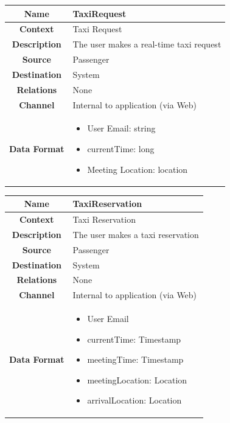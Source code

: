 \documentclass[11pt, a4paper,titlepage]{article}
\begin{document}
		\begin{tabularx}{\textwidth}{| c | X |}
			\hline
			\textbf{Name} & 
			TaxiRequest
			\\
			\hline
			\textbf{Context} & 
				Taxi Request
			\\
			\hline
			\textbf{Description} & 
			The user makes a real-time taxi request
			\\
			\hline
			\textbf{Source} &
				Passenger
			\\
			\hline
			\textbf{Destination} & 
				System
			\\
			\hline
			\textbf{Relations} & 
				None
			\\
			\hline
			\textbf{Channel} & 
				Internal to application (via Web)
			\\
			\hline
			\textbf{Data Format} & 
			 \begin{itemize}
				 \item User Email: string
				 \item currentTime: long
				 \item Meeting Location: location
			 \end{itemize}
			\\
			\hline		
		\end{tabularx}
		\begin{tabularx}{\textwidth}{| c | X |}
			\hline
			\textbf{Name} & 
			TaxiReservation
			\\
			\hline
			\textbf{Context} & 
			Taxi Reservation
			\\
			\hline
			\textbf{Description} & 
			The user makes a taxi reservation
			\\
			\hline
			\textbf{Source} &
			Passenger
			\\
			\hline
			\textbf{Destination} & 
			System
			\\
			\hline
			\textbf{Relations} & 
			None
			\\
			\hline
			\textbf{Channel} & 
			Internal to application (via Web)
			\\
			\hline
			\textbf{Data Format} & 
			\begin{itemize}
				\item User Email
				\item currentTime: Timestamp
				\item meetingTime: Timestamp
				\item meetingLocation: Location
				\item arrivalLocation: Location
			\end{itemize}
			\\
			\hline		
		\end{tabularx}
\end{document}
